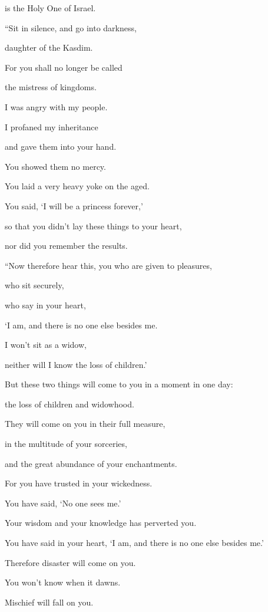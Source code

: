 is the Holy One of Israel.


\vspace{\baselineskip} \myverse{}“Sit in silence, and go into darkness,

daughter of the Kasdim.

For you shall no longer be called

the mistress of kingdoms.

\myverse{}I was angry with my people.

I profaned my inheritance

and gave them into your hand.

You showed them no mercy.

You laid a very heavy yoke on the aged.

\myverse{}You said, ‘I will be a princess forever,’

so that you didn’t lay these things to your heart,

nor did you remember the results.


\vspace{\baselineskip} \myverse{}“Now therefore hear this, you who are given to pleasures,

who sit securely,

who say in your heart,

‘I am, and there is no one else besides me.

I won’t sit as a widow,

neither will I know the loss of children.’

\myverse{}But these two things will come to you in a moment in one day:

the loss of children and widowhood.

They will come on you in their full measure,

in the multitude of your sorceries,

and the great abundance of your enchantments.

\myverse{}For you have trusted in your wickedness.

You have said, ‘No one sees me.’

Your wisdom and your knowledge has perverted you.

You have said in your heart, ‘I am, and there is no one else besides me.’

\myverse{}Therefore disaster will come on you.

You won’t know when it dawns.

Mischief will fall on you.

